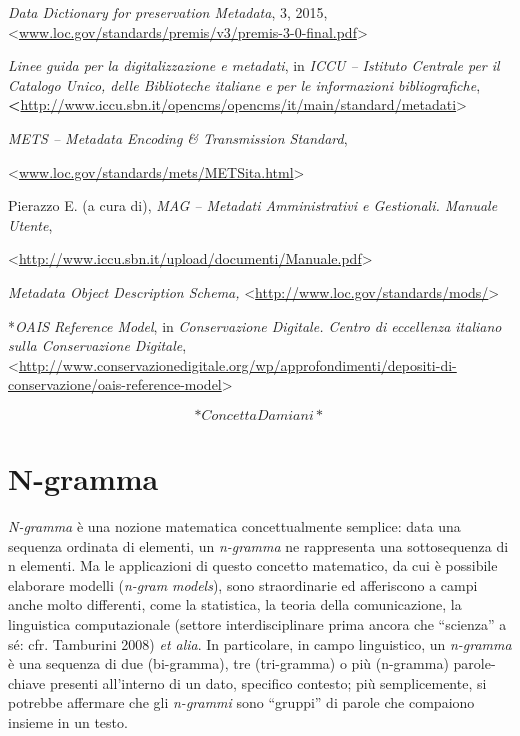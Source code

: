 \documentclass[
  b5paper,
  twoside,
  11pt,
  chapterprefix=false,
  bibliography=totocnumbered,
  listof=flat]{scrbook}
\begin{document}
\emph{Data Dictionary for preservation Metadata}, 3, 2015,
\textless{}{\href{http://www.loc.gov/standards/premis/v3/premis-3-0-final.pdf}{www.loc.gov/standards/premis/v3/premis-3-0-final.pdf}\textgreater{}}

\emph{Linee guida per la digitalizzazione e metadati}, in \emph{ICCU -- Istituto
Centrale per il Catalogo Unico, delle Biblioteche italiane e per le
informazioni bibliografiche},
\textbf{\textless{}}{\url{http://www.iccu.sbn.it/opencms/opencms/it/main/standard/metadati}\textgreater{}}

\emph{METS -- Metadata Encoding \& Transmission Standard},

\textless{}\href{http://www.loc.gov/standards/mets/METSita.html}{{www.loc.gov/standards/mets/METSita.html}}\textgreater{}

Pierazzo E. (a cura di), \emph{MAG -- Metadati Amministrativi e Gestionali.
Manuale Utente},

\textless{}{\url{http://www.iccu.sbn.it/upload/documenti/Manuale.pdf}\textgreater{}}

\emph{Metadata Object Description Schema,}
\textless{}\href{http://www.loc.gov/standards/mods/}{{http://www.loc.gov/standards/mods/}}\textgreater{}

*\emph{OAIS Reference Model}, in \emph{Conservazione Digitale. Centro di
eccellenza italiano sulla Conservazione Digitale},
\textless{}{\url{http://www.conservazionedigitale.org/wp/approfondimenti/depositi-di-conservazione/oais-reference-model}\textgreater{}}

\[*Concetta Damiani*\]

\hypertarget{n-gramma}{%
\chapter{N-gramma}\label{n-gramma}}

\emph{N-gramma} è una nozione matematica concettualmente semplice: data una
sequenza ordinata di elementi, un \emph{n-gramma} ne rappresenta una
sottosequenza di n elementi. Ma le applicazioni di questo concetto
matematico, da cui è possibile elaborare modelli (\emph{n-gram models}), sono
straordinarie ed afferiscono a campi anche molto differenti, come la
statistica, la teoria della comunicazione, la linguistica computazionale
(settore interdisciplinare prima ancora che \enquote{scienza} a sé: cfr.
Tamburini 2008) \emph{et alia}. In particolare, in campo linguistico, un
\emph{n-gramma} è una sequenza di due (bi-gramma), tre (tri-gramma) o più
(n-gramma) parole-chiave presenti all'interno di un dato, specifico
contesto; più semplicemente, si potrebbe affermare che gli \emph{n-grammi}
sono \enquote{gruppi} di parole che compaiono insieme in un testo.
\end{document}
